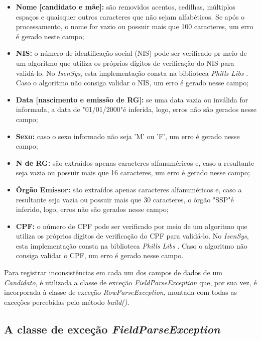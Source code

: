 \documentclass[
	12pt,			%
	openright,		%
	oneside,	
	a4paper,		%
	english,		%
	brazil			%
]{abntex2/abntex2}  %
\begin{document}
				\begin{itemize}
					
					\item \textbf{Nome [candidato e mãe]:} são removidos acentos, cedilhas, múltiplos espaços e quaisquer outros caracteres que não sejam alfabéticos. Se após o processamento, o nome for vazio ou possuir mais que 100 caracteres, um erro é gerado neste campo;
					\item \textbf{NIS:} o número de identificação social (NIS) pode ser verificado pr meio de um algoritmo que utiliza os próprios dígitos de verificação do NIS para validá-lo. No \textit{IsenSys}, esta implementação consta na biblioteca \textit{Phills Libs} \cite{phills-libs}. Caso o algoritmo não consiga validar o NIS, um erro é gerado nesse campo;
					\item \textbf{Data [nascimento e emissão de RG]:} se uma data vazia ou inválida for informada, a data de "01/01/2000"\space é inferida, logo, erros não são gerados nesse campo;
					\item \textbf{Sexo:} caso o sexo informado não seja 'M' ou 'F', um erro é gerado nesse campo;
					\item \textbf{N{\textordmasculine} de RG:} são extraídos apenas caracteres alfanuméricos e, caso a resultante seja vazia ou possuir mais que 16 caracteres, um erro é gerado nesse campo;
					\item \textbf{Órgão Emissor:} são extraídos apenas caracteres alfanuméricos e, caso a resultante seja vazia ou possuir mais que 30 caracteres, o órgão "SSP"\space é inferido, logo, erros não são gerados nesse campo;
					\item \textbf{CPF:} o número de CPF pode ser verificado por meio de um algoritmo que utiliza os próprios dígitos de verificação do CPF para validá-lo. No \textit{IsenSys}, esta implementação consta na biblioteca \textit{Phills Libs} \cite{phills-libs}. Caso o algoritmo não consiga validar o CPF, um erro é gerado nesse campo.
					
				\end{itemize}
				
				Para registrar inconsistências em cada um dos campos de dados de um \textit{Candidato}, é utilizada a classe de exceção \textit{FieldParseException} que, por sua vez, é incorporada à classe de exceção \textit{RowParseException}, montada com todas as exceções percebidas pelo método \textit{build()}.

			\subsection{A classe de exceção \textit{FieldParseException}}
	
\end{document}

